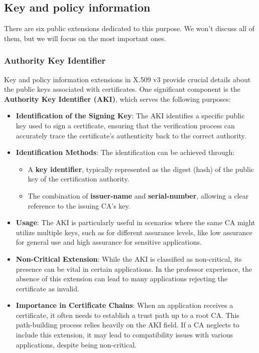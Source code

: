\subsection{Key and policy information}


There are six public extensions dedicated to this purpose. 
We won't discuss all of them, but we will focus on the most important 
ones.

\subsubsection{Authority Key Identifier}

Key and policy information extensions in X.509 v3 provide crucial
details about the public keys associated with certificates. One
significant component is the \textbf{Authority Key Identifier (AKI)},
which serves the following purposes:

\begin{itemize}
  \item \textbf{Identification of the Signing Key}: The AKI identifies
    a specific public key used to sign a certificate, ensuring that
    the verification process can accurately trace the certificate's
    authenticity back to the correct authority.

  \item \textbf{Identification Methods}: The identification can be
    achieved through:
    \begin{itemize}
      \item A \textbf{key identifier}, typically represented as the
        digest (hash) of the public key of the certification authority.
      \item The combination of \textbf{issuer-name} and 
        \textbf{serial-number}, allowing a clear reference to the
        issuing CA's key.
    \end{itemize}

  \item \textbf{Usage}: The AKI is particularly useful in scenarios
    where the same CA might utilize multiple keys, such as for 
    different assurance levels, like low assurance for general use 
    and high assurance for sensitive applications.

  \item \textbf{Non-Critical Extension}: While the AKI is classified 
    as non-critical, its presence can be vital in certain 
    applications. In the professor experience, the absence of this 
    extension can lead to many applications rejecting the certificate
    as invalid.

  \item \textbf{Importance in Certificate Chains}: When an 
    application receives a certificate, it often needs to establish 
    a trust path up to a root CA. This path-building process relies 
    heavily on the AKI field. If a CA neglects to include this 
    extension, it may lead to compatibility issues with various 
    applications, despite being non-critical.
\end{itemize}

